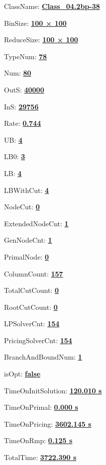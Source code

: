\documentclass[11pt]{article}
\begin{document}
\pagestyle{empty}


ClassName: \underline{\textbf{Class_04.2bp-38}}
\par
BinSize: \underline{\textbf{100 × 100}}
\par
ReduceSize: \underline{\textbf{100 × 100}}
\par
TypeNum: \underline{\textbf{78}}
\par
Num: \underline{\textbf{80}}
\par
OutS: \underline{\textbf{40000}}
\par
InS: \underline{\textbf{29756}}
\par
Rate: \underline{\textbf{0.744}}
\par
UB: \underline{\textbf{4}}
\par
LB0: \underline{\textbf{3}}
\par
LB: \underline{\textbf{4}}
\par
LBWithCut: \underline{\textbf{4}}
\par
NodeCut: \underline{\textbf{0}}
\par
ExtendedNodeCnt: \underline{\textbf{1}}
\par
GenNodeCnt: \underline{\textbf{1}}
\par
PrimalNode: \underline{\textbf{0}}
\par
ColumnCount: \underline{\textbf{157}}
\par
TotalCutCount: \underline{\textbf{0}}
\par
RootCutCount: \underline{\textbf{0}}
\par
LPSolverCnt: \underline{\textbf{154}}
\par
PricingSolverCnt: \underline{\textbf{154}}
\par
BranchAndBoundNum: \underline{\textbf{1}}
\par
isOpt: \underline{\textbf{false}}
\par
TimeOnInitSolution: \underline{\textbf{120.010 s}}
\par
TimeOnPrimal: \underline{\textbf{0.000 s}}
\par
TimeOnPricing: \underline{\textbf{3602.145 s}}
\par
TimeOnRmp: \underline{\textbf{0.125 s}}
\par
TotalTime: \underline{\textbf{3722.390 s}}
\par
\newpage
\end{document}
